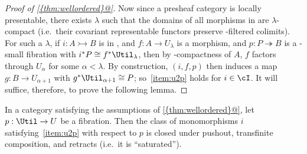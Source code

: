 \documentclass{amsart}
\let\al\alpha
\let\ka\kappa
\let\la\lambda
\let\cof\rightarrowtail
\let\fib\twoheadrightarrow
\theoremstyle{remark}
{\newtheorem{{rmk}}[thm]{{Remark}}}
\numberwithin{equation}{section}
\theoremstyle{plain}
\begin{document}
\begin{proof}[
  Proof of {\ref{{thm:wellordered}@}}]
  Now since a presheaf category is locally presentable, there exists $\la$ such that the domains of all morphisms in \cI are $\la$-compact (i.e.\ their covariant representable functors preserve \la-filtered colimits).
  For such a $\la$, if $i\colon A\cof B$ is in \cI, and $f\colon A\to U_\la$ is a morphism, and $p\colon P\fib B$ is a \ka-small fibration with $i^*P \cong f^*\Util_\la$, then by \la-compactness of $A$, $f$ factors through $U_\al$ for some $\al<\la$.
  By construction, $(i,f,p)$ then induces a map $g\colon B\to U_{\al+1}$ with $g^*\Util_{\al+1} \cong P$; so~\ref{item:u2p} holds for $i\in\cI$.
  It will suffice, therefore, to prove the following lemma.
\end{proof}

\begin{lem}
  In a category satisfying the assumptions of {\ref{{thm:wellordered}@}}, let $p:\Util\to U$ be a fibration.
  Then the class of monomorphisms $i$ satisfying~\ref{item:u2p} with respect to $p$ is closed under pushout, transfinite composition, and retracts (i.e.\ it is ``saturated'').
\end{lem}
\end{document}
